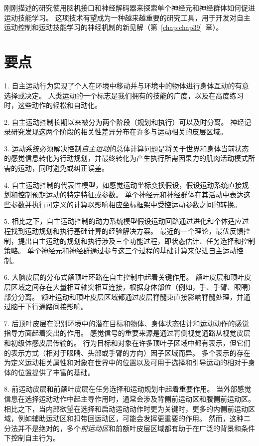 刚刚描述的研究使用脑机接口和神经解码器来探索单个神经元和神经群体如何促进运动技能学习。
这项技术有望成为一种越来越重要的研究工具，用于开发对自主运动控制和运动技能学习的神经机制的新见解（第~\ref{chap:chap39}~章）。



\section{要点}

1. 自主运动行为实现了个人在环境中移动并与环境中的物体进行身体互动的有意选择或决定。
人类运动的一个标志是我们拥有的技能的广度，以及在高度练习时，这些动作的轻松和自动化。


2. 自主运动控制长期以来被分为两个阶段（规划和执行）可以及时分离。
神经记录研究发现这两个阶段的相关性差异分布在许多与运动相关的皮层区域。


3. 运动系统必须解决控制\textit{自主运动}的总体计算问题是将关于世界和身体当前状态的感觉信息转化为行动规划，并最终转化为产生执行所需因果力的肌肉活动模式所需的运动，同时避免或纠正误差。


4. 自主运动控制的代表性模型，如感觉运动坐标变换假设，假设运动系统直接规划和控制预期运动的特定特征或参数。
单个神经元和神经群体在其活动中表达这些参数并执行可定义的计算以影响相应坐标框架中受控运动参数之间的转换。


5. 相比之下，自主运动控制的动力系统模型假设运动回路通过进化和个体适应过程找到运动规划和执行基础计算的经验解决方案。
最近的一个理论，最优反馈控制，提出自主运动的规划和执行涉及三个功能过程，即状态估计、任务选择和控制策略。
单个神经元和神经群通过参与这三个过程的基础计算来促进自主运动控制。


6. 大脑皮层的分布式额顶叶环路在自主控制中起着关键作用。
额叶皮层和顶叶皮层区域之间存在大量相互轴突相互连接，根据身体部位（例如，手、手臂、眼睛）部分分离。
额叶运动和顶叶皮层区域都通过皮层脊髓束直接影响脊髓处理，并通过脑干下行通路间接影响。


7. 后顶叶皮层在识别环境中的潜在目标和物体、身体状态估计和运动动作的感觉指导方面起着突出的作用。
感觉信号的重要来源是通过背侧视觉通路从视觉皮层和初级体感皮层传输的。
行为目标和对象在许多顶叶子区域中都有表示，但它们的表示方式（相对于眼睛、头部或手臂的方向）因子区域而异。
多个表示的存在为定义运动相关属性和对象在世界中的位置以及可用于选择和引导运动的相对于身体的位置提供了丰富的基础。


8. 前运动皮层和前额叶皮层在任务选择和运动规划中起着重要作用。
当外部感觉信息在选择运动动作中起主导作用时，通常会涉及背侧前运动区和腹侧前运动区。
相比之下，当内部欲望在选择和启动运动动作时更为关键时，更多的内侧前运动区域，例如辅助运动区和扣带回运动区，可能会发挥更重要的作用。
然而，这种二分法并不是绝对的，多个\textit{前运动区}和前额叶皮层区域都有助于在广泛的背景和条件下控制自主行为。



